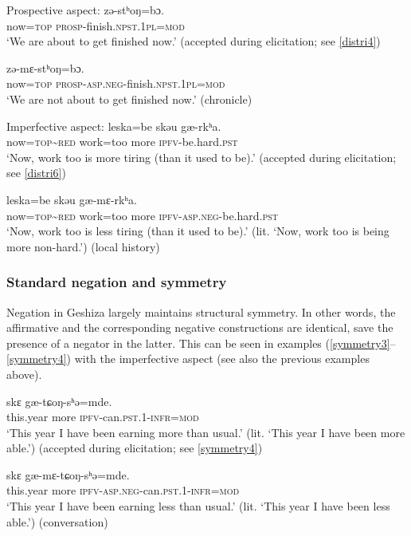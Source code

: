 \documentclass[output=paper,colorlinks,citecolor=brown]{langscibook}
\begin{document}
\noindent Prospective aspect:
\ea
\label{distri3}
 	{zə-stʰoŋ=bɔ.}   \\  
     now=\textsc{top}	\textsc{prosp}-finish.\textsc{npst.1pl=mod}\\ 
\glt `We are about to get finished now.' (accepted during elicitation; see \ref{distri4})
\z

\ea
\label{distri4}
 	{zə-mɛ-stʰoŋ=bɔ.}\\  
     now=\textsc{top}	\textsc{prosp-asp.neg}-finish.\textsc{npst.1pl=mod}\\ 
\glt `We are not about to get finished now.' (chronicle)
\z

{
\noindent Imperfective aspect:
\ea
\label{distri5}
  {leska=be}     {skəu}  {gæ-rkʰa}.\\  
     now=\textsc{top}\textasciitilde \textsc{red} work=too more \textsc{ipfv}-be.hard.\textsc{pst}\\ 
\glt `Now, work too is more tiring (than it used to be).' (accepted during elicitation; see \ref{distri6})
\z
}

\ea
\label{distri6}
  {leska=be}     {skəu}  {gæ-mɛ-rkʰa}.\\  
     now=\textsc{top}\textasciitilde \textsc{red} work=too more \textsc{ipfv-asp.neg}-be.hard.\textsc{pst}\\ 
\glt `Now, work too is less tiring (than it used to be).' (lit. `Now, work too is being more non-hard.') (local history) 
\z

\subsubsection{Standard negation and symmetry}
Negation in Geshiza largely maintains structural symmetry.  In other words, the affirmative and the corresponding negative constructions are identical, save the presence of a negator in the latter. This can be seen in examples (\ref{symmetry3}--\ref{symmetry4}) with the imperfective aspect (see also the previous examples above).

\ea
\label{symmetry3}
	{skɛ} {gæ-tɕoŋ-sʰə=mde}.\\  
     this.year      more    \textsc{ipfv}-can.\textsc{pst.1-infr=mod}\\
\glt `This year I have been earning more than usual.' (lit. `This year I have been more able.') (accepted during elicitation; see \ref{symmetry4})
\z

\ea
\label{symmetry4}
	{skɛ} {gæ-mɛ-tɕoŋ-sʰə=mde}.\\  
     this.year      more    \textsc{ipfv-asp.neg}-can.\textsc{pst.1-infr=mod}\\
\glt `This year I have been earning less than usual.' (lit. `This year I have been less able.') (conversation)
\z
\end{document}
